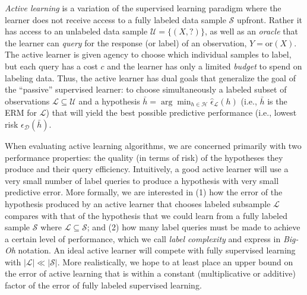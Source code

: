 \textit{Active learning} is a variation of the supervised learning paradigm where the learner does not receive access to a fully labeled data sample $\mathcal{S}$ upfront. Rather it has access to an unlabeled data sample $\mathcal{U} = \{(X, ?)\}$, as well as an \textit{oracle} that the learner can \textit{query} for the response (or label) of an observation, $Y = \mathrm{or}(X)$. The active learner is given agency to choose which individual samples to label, but each query has a cost $c$ and the learner has only a limited \textit{budget} to spend on labeling data. Thus, the active learner has dual goals that generalize the goal of the ``passive'' supervised learner: to choose simultaneously a labeled subset of observations $\mathcal{L} \subseteq \mathcal{U}$ and a hypothesis $\bar{h} = \arg\min_{h \in \mathcal{H}} \hat{\epsilon}_{\mathcal{L}}(h)$ (i.e., $\bar{h}$ is the ERM for $\mathcal{L}$) that will yield the best possible predictive performance (i.e., lowest risk $\epsilon_{\mathcal{D}}(\bar{h})$.

When evaluating active learning algorithms, we are concerned primarily with two performance properties: the quality (in terms of risk) of the hypotheses they produce and their query efficiency. Intuitively, a good active learner will use a very small number of label queries to produce a hypothesis with very small predictive error. More formally, we are interested in (1) how the error of the hypothesis produced by an active learner that chooses labeled subsample $\mathcal{L}$ compares with that of the hypothesis that we could learn from a fully labeled sample $\mathcal{S}$ where $\mathcal{L} \subseteq \mathcal{S}$; and (2) how many label queries must be made to achieve a certain level of performance, which we call \textit{label complexity} and express in \textit{Big-Oh} notation. An ideal active learner will compete with fully supervised learning with $|\mathcal{L}| \ll |\mathcal{S}|$. More realistically, we hope to at least place an upper bound on the error of active learning that is within a constant (multiplicative or additive) factor of the error of fully labeled supervised learning.

